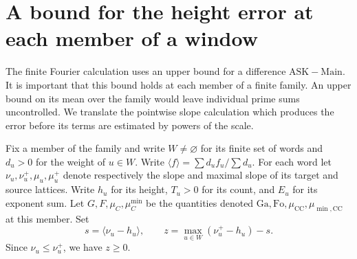 \section{A bound for the height error at each member of a window}
\label{sec:height-gap}

The finite Fourier calculation uses an upper bound for a difference
\(\mathrm{ASK}-\mathrm{Main}\). It is important that this bound holds at
each member of a finite family. An upper bound on its mean over the
family would leave individual prime sums uncontrolled. We translate
the pointwise slope calculation which produces the error before its
terms are estimated by powers of the scale.

Fix a member of the family and write \(W\ne\varnothing\) for its
finite set of words and \(d_u>0\) for the weight of \(u\in W\).
Write \(\langle f\rangle=\sum d_u f_u/\sum d_u\). For each word let
\(\nu_u,\nu_u^+,\mu_u,\mu_u^+\) denote respectively the slope and
maximal slope of its target and source lattices. Write \(h_u\) for its
height, \(T_u>0\) for its count, and \(E_u\) for its exponent sum.
Let \(G,F,\mu_C,\mu_C^{\min}\) be the quantities denoted
\(\mathrm{Ga},\mathrm{Fo},\mu_{\mathrm{CC}},\mu_{\min,\mathrm{CC}}\)
at this member. Set
\[
 s=\langle\nu_u-h_u\rangle,\qquad
 z=\max_{u\in W}(\nu_u^+-h_u)-s .
\]
Since \(\nu_u\le\nu_u^+\), we have \(z\ge0\).


